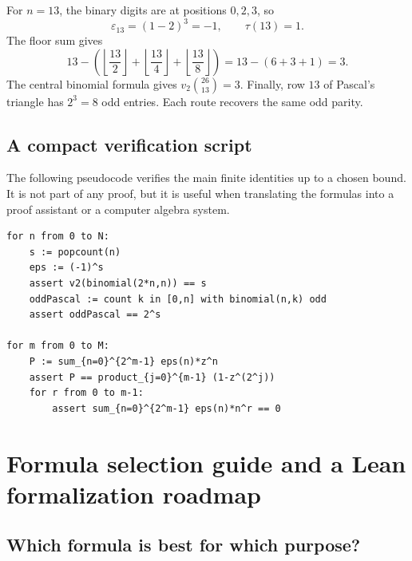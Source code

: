 \documentclass[11pt,oneside]{article}
\theoremstyle{definition}
\theoremstyle{remark}
\newcommand{\vtwo}{v_2}
\newcommand{\eps}{\varepsilon}
\newcommand{\1}{\mathbf 1}
\begin{document}
For \(n=13\), the binary digits are at positions \(0,2,3\), so
\[
 \eps_{13}=(1-2)^3=-1,
 \qquad
 \tau(13)=1.
\]
The floor sum gives
\[
 13-\left(\left\lfloor\frac{13}{2}\right\rfloor
 +\left\lfloor\frac{13}{4}\right\rfloor
 +\left\lfloor\frac{13}{8}\right\rfloor\right)
 =13-(6+3+1)=3.
\]
The central binomial formula gives
\(\vtwo\binom{26}{13}=3\).  Finally, row \(13\) of Pascal's triangle has
\(2^3=8\) odd entries.  Each route recovers the same odd parity.

\subsection{A compact verification script}

The following pseudocode verifies the main finite identities up to a chosen bound.  It is not
part of any proof, but it is useful when translating the formulas into a proof assistant or a
computer algebra system.

\begin{lstlisting}[style=pseudo]
for n from 0 to N:
    s := popcount(n)
    eps := (-1)^s
    assert v2(binomial(2*n,n)) == s
    oddPascal := count k in [0,n] with binomial(n,k) odd
    assert oddPascal == 2^s

for m from 0 to M:
    P := sum_{n=0}^{2^m-1} eps(n)*z^n
    assert P == product_{j=0}^{m-1} (1-z^(2^j))
    for r from 0 to m-1:
        assert sum_{n=0}^{2^m-1} eps(n)*n^r == 0
\end{lstlisting}

\section{Formula selection guide and a Lean formalization roadmap}
\label{p3:sec:roadmap}

\subsection{Which formula is best for which purpose?}
\end{document}
